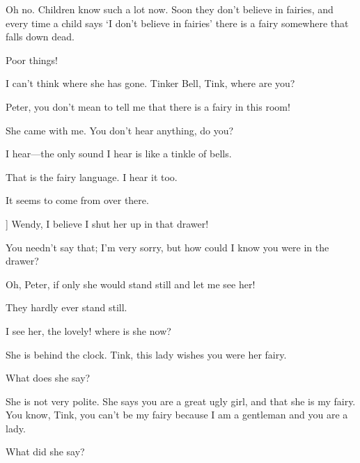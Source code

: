 \begin{drama}
\peterspeaks
Oh no.
Children know such a lot now.
Soon they don’t believe in fairies,
and every time a child says ‘I don’t believe in fairies’ there is a fairy somewhere that falls down dead.

\wendyspeaks
Poor things!

I can’t think where she has gone.
Tinker Bell, Tink, where are you?

Peter, you don’t mean to tell me that there is a fairy in this room!

She came with me.
You don’t hear anything, do you?

\wendyspeaks
I hear—the only sound I hear is like a tinkle of bells.

\peterspeaks
That is the fairy language.
I hear it too.

\wendyspeaks
It seems to come from over there.

\peterspeaks
{}]
Wendy, I believe I shut her up in that drawer!


You needn’t say that; I’m very sorry, but how could I know you were in the drawer?

Oh, Peter, if only she would stand still and let me see her!

They hardly ever stand still.


\wendyspeaks
I see her, the lovely!
where is she now?

\peterspeaks
She is behind the clock.
Tink, this lady wishes you were her fairy.

\wendyspeaks
What does she say?

\peterspeaks
She is not very polite.
She says you are a great ugly girl, and that she is my fairy.
You know, Tink, you can’t be my fairy because I am a gentleman and you are a lady.


\wendyspeaks
What did she say?


\end{drama}
